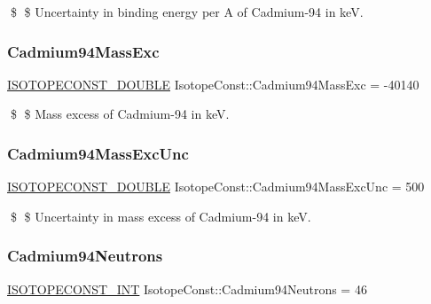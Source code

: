 \$ \$ Uncertainty in binding energy per A of Cadmium-\/94 in keV. \mbox{\label{group___isotope_const-_cadmium-_cd94_ga677b0f4da3ba7f73ec68c16529d8c6d1}} 
\subsubsection{\texorpdfstring{Cadmium94\+Mass\+Exc}{Cadmium94MassExc}}
{\footnotesize\ttfamily \mbox{\hyperlink{group___isotope_const-_macros_ga8f45a7272ce02c0b4c65c44636ed719a}{I\+S\+O\+T\+O\+P\+E\+C\+O\+N\+S\+T\+\_\+\+D\+O\+U\+B\+LE}} Isotope\+Const\+::\+Cadmium94\+Mass\+Exc = -\/40140}

\$ \$ Mass excess of Cadmium-\/94 in keV. \mbox{\label{group___isotope_const-_cadmium-_cd94_ga6c264c5dc4a6ef9f13702c27f0f211e4}} 
\subsubsection{\texorpdfstring{Cadmium94\+Mass\+Exc\+Unc}{Cadmium94MassExcUnc}}
{\footnotesize\ttfamily \mbox{\hyperlink{group___isotope_const-_macros_ga8f45a7272ce02c0b4c65c44636ed719a}{I\+S\+O\+T\+O\+P\+E\+C\+O\+N\+S\+T\+\_\+\+D\+O\+U\+B\+LE}} Isotope\+Const\+::\+Cadmium94\+Mass\+Exc\+Unc = 500}

\$ \$ Uncertainty in mass excess of Cadmium-\/94 in keV. \mbox{\label{group___isotope_const-_cadmium-_cd94_ga2e2c3f5dce1b6977fc4bd7008cb15179}} 
\subsubsection{\texorpdfstring{Cadmium94\+Neutrons}{Cadmium94Neutrons}}
{\footnotesize\ttfamily \mbox{\hyperlink{group___isotope_const-_macros_ga5f18360b3e99483a35c32d789e62621c}{I\+S\+O\+T\+O\+P\+E\+C\+O\+N\+S\+T\+\_\+\+I\+NT}} Isotope\+Const\+::\+Cadmium94\+Neutrons = 46}

